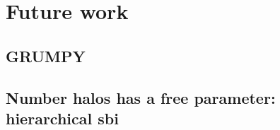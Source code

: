 
\section{Future work}
\subsection[semianalicit model]{GRUMPY} 
\subsection{Number halos has a free parameter: hierarchical sbi}
